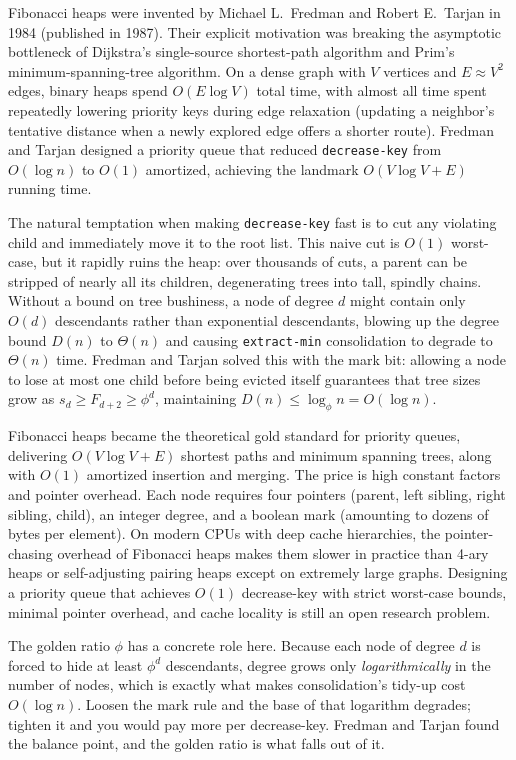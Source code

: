 \begin{historybox}
Fibonacci heaps were invented by Michael L.~Fredman and Robert E.~Tarjan in 1984 (published in 1987). Their explicit motivation was breaking the asymptotic bottleneck of Dijkstra's single-source shortest-path algorithm and Prim's minimum-spanning-tree algorithm. On a dense graph with $V$ vertices and $E \approx V^2$ edges, binary heaps spend $O(E\log V)$ total time, with almost all time spent repeatedly lowering priority keys during edge relaxation (updating a neighbor's tentative distance when a newly explored edge offers a shorter route). Fredman and Tarjan designed a priority queue that reduced \lstinline|decrease-key| from $O(\log n)$ to $O(1)$ amortized, achieving the landmark $O(V\log V + E)$ running time.

The natural temptation when making \lstinline|decrease-key| fast is to cut any violating child and immediately move it to the root list. This naive cut is $O(1)$ worst-case, but it rapidly ruins the heap: over thousands of cuts, a parent can be stripped of nearly all its children, degenerating trees into tall, spindly chains. Without a bound on tree bushiness, a node of degree $d$ might contain only $O(d)$ descendants rather than exponential descendants, blowing up the degree bound $D(n)$ to $\Theta(n)$ and causing \lstinline|extract-min| consolidation to degrade to $\Theta(n)$ time. Fredman and Tarjan solved this with the mark bit: allowing a node to lose at most one child before being evicted itself guarantees that tree sizes grow as $s_d \ge F_{d+2} \ge \phi^d$, maintaining $D(n) \le \log_\phi n = O(\log n)$.

Fibonacci heaps became the theoretical gold standard for priority queues, delivering $O(V\log V + E)$ shortest paths and minimum spanning trees, along with $O(1)$ amortized insertion and merging. The price is high constant factors and pointer overhead. Each node requires four pointers (parent, left sibling, right sibling, child), an integer degree, and a boolean mark (amounting to dozens of bytes per element). On modern CPUs with deep cache hierarchies, the pointer-chasing overhead of Fibonacci heaps makes them slower in practice than 4-ary heaps or self-adjusting pairing heaps except on extremely large graphs. Designing a priority queue that achieves $O(1)$ decrease-key with strict worst-case bounds, minimal pointer overhead, and cache locality is still an open research problem.
\end{historybox}

\begin{aestheticbox}
The golden ratio $\phi$ has a concrete role here. Because
each node of degree $d$ is forced to hide at least $\phi^d$ descendants, degree
grows only \emph{logarithmically} in the number of nodes, which is exactly what
makes consolidation's tidy-up cost $O(\log n)$. Loosen the mark rule and the base
of that logarithm degrades; tighten it and you would pay more per decrease-key.
Fredman and Tarjan found the balance point, and the golden ratio is what falls
out of it.
\end{aestheticbox}

